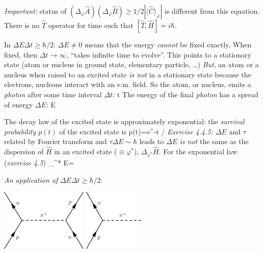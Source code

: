 \documentclass[12pt]{article}
\begin{document}
\emph{Important:} status of $\left(\Delta_{\varphi} \hat{A}\right)\left(\Delta_{\varphi} \hat{B}\right) \geqslant 1/2 |\langle\hat{C}\rangle_{\varphi}|$
is different from this equation. There is no
$\hat{T}$ operator for time such that
$[\hat{T},\hat{H}] = i\hbar$.

In $\Delta E \Delta t \geq \hbar / 2$: $\Delta E \neq 0$ means that the energy
\emph{cannot} be fixed exactly. When fixed,
then $\Delta t \to \infty$, ``takes infinite time
to evolve''. This points to a stationary state (atom or
nucleus in ground state, elementary particle, \ldots)
\emph{But}, an atom or a nucleus when raised
to an excited state \emph{is not} in a stationary
state because the electrons, nucleons
interact with an e.m. field.
So the atom, or nucleus, emits a \emph{photon}
after some time interval $\Delta t$:
\be
{} \to \Delta t \equiv \tau
\ee
The energy of the final \emph{photon} has
a spread of energy $\Delta E$:
\be
{} \to \Delta E \equiv \hbar \Gamma
\ee


The decay law of the excited state is approximately
exponential: the \emph{survival probability} $p(t)$
of the excited state is
\be
p(t)=e^{-t / \tau}
\ee
\emph{Exercise 4.4.5:} $\Delta E$ and $\tau$ related by Fourier
transform and $\tau\Delta E \sim \hbar$ leads to
\be
\tau \Gamma {}
\ee
$\Delta E$ \emph{is not} the same as the dispersion of $\hat{H}$
in an excited state ($\equiv \varphi^*$), $\Delta_{\varphi^*} \hat{H}$.
For the exponential law (\emph{exercise 4.5})
\be
\Delta_{\varphi^*}  \gg \Delta E=\hbar \Gamma
\ee

\emph{An application of} $\Delta E \Delta t \geqslant \hbar / 2$: 

\begin{center}
\includegraphics[height=8em]{Figures/np-piplus-pn.pdf}\quad\quad%
\includegraphics[height=8em]{Figures/np-piplus.pdf}
\end{center}
\end{document}
